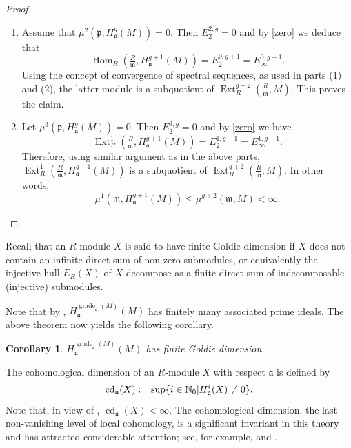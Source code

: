 \documentclass[12pt,twoside, final]{amsart}
\numberwithin{equation}{section}
\newtheorem{cor}[thm]{Corollary}
\newtheorem{nota rem}[thm]{Notation and Remark}
\newtheorem{defen rem}[thm]{Definition and Remark}
\def\Ext{\operatorname{Ext}}
\def\Hom{\operatorname{Hom}}
\def\grade{\operatorname{grade}}
\def\cd{\operatorname{cd}}
\def\id{\operatorname{id}}
\newcommand{\p}{\mathfrak{p}}
\newcommand{\fa}{\mathfrak{a}}
\newcommand{\m}{\mathfrak{m}}
\newcommand{\NN}{\mathbb{N}}
\begin{document}
\begin{proof}
\begin{enumerate}
 \item Assume that $\mu^2(\p, H^g_{\fa}(M))= 0$. Then $E_2^{2, g}= 0$ and by \ref{zero} we deduce that 
 \[\Hom_{R }(\tfrac{R}{\m}, H^{g+ 1}_{\fa}(M))= E_2^{0, g+ 1}= E_{\infty}^{0, g+ 1}.\]
 Using the concept of convergence of spectral sequences, as used in parts (1) and (2),  the latter module is a subquotient of $\Ext^{g+ 2}_{R}(\tfrac{R}{\m}, M)$. This proves the claim.
 \item Let $\mu^3(\p, H^g_{\fa}(M))= 0$. Then $E_2^{3, g}= 0$ and by \ref{zero} we have 
 \[\Ext^1_{R }(\tfrac{R}{\m}, H^{g+ 1}_{\fa}(M))= E_2^{1, g+ 1}= E_{\infty}^{1, g+ 1}.\] 
 Therefore, using similar argument as in the above parts,  $\Ext^1_{R }(\tfrac{R}{\m}, H^{g+ 1}_{\fa}(M))$ is a subquotient of $\Ext^{g+ 2}_{R}(\tfrac{R}{\m}, M)$. In other words, $$\mu^1(\m, H^{g+ 1}_{\fa}(M)) \leq \mu^{g+ 2}(\m, M)< \infty.$$
 \end{enumerate}
\end{proof}
Recall that an $R$-module $X$ is said to have ﬁnite Goldie dimension
if $X$ does not contain an inﬁnite direct sum of non-zero submodules, or equivalently the
injective hull $E_R(X)$ of $X$ decompose as a ﬁnite direct sum of indecomposable (injective)
submodules.

 Note that by \cite[Theorem 2. 2]{lash}, $H^{\grade_{\fa}(M)}_{\fa}(M)$ has finitely many associated prime ideals. The above theorem now yields the following corollary.
\begin{cor}
    $H^{\grade_{\fa}(M)}_{\fa}(M)$ has ﬁnite Goldie dimension.
\end{cor}
 
The  cohomological dimension
  of an $R$-module $X$ with respect   $\fa$ is defined by
\begin{equation}\label{defcd}
    \cd_{\fa}(X):= \sup\{i\in \NN_0\arrowvert H^i_{\fa}(X)\neq 0\}.
\end{equation}
Note that, in view of \cite[Corollary 3. 3. 3]{bsh},   $\cd_{\fa}(X)< \infty.$
The cohomological dimension, the last non-vanishing level of local cohomology, is a significant invariant in this theory and has attracted considerable attention; see, for example, \cite{dnt, l}  and \cite{o}.

\end{document}
